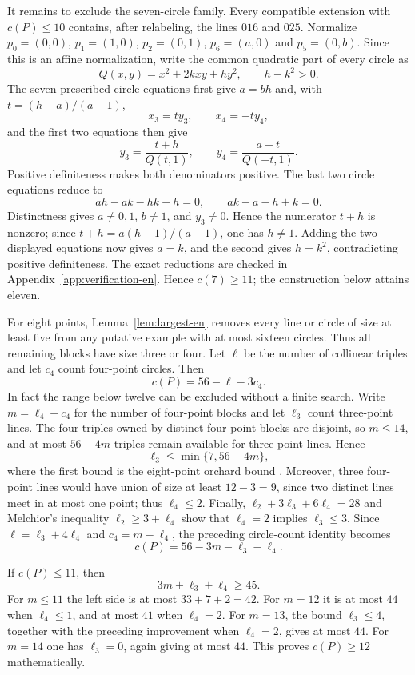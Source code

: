\documentclass[11pt,a4paper]{article}
\theoremstyle{definition}
\begin{document}
It remains to exclude the seven-circle family.  Every compatible extension with
$c(P)\le10$ contains, after relabeling, the lines $016$ and $025$.  Normalize
$p_0=(0,0)$, $p_1=(1,0)$, $p_2=(0,1)$, $p_6=(a,0)$ and $p_5=(0,b)$.  Since this
is an affine normalization, write the common quadratic part of every circle as
\[
 Q(x,y)=x^2+2kxy+hy^2,\qquad h-k^2>0.
\]
The seven prescribed circle equations first give $a=bh$ and, with
$t=(h-a)/(a-1)$,
\[
 x_3=ty_3,\qquad x_4=-ty_4,
\]
and the first two equations then give
\[
 y_3=\frac{t+h}{Q(t,1)},\qquad
 y_4=\frac{a-t}{Q(-t,1)}.
\]
Positive definiteness makes both denominators positive.  The last two circle
equations reduce to
\[
ah-ak-hk+h=0,\qquad ak-a-h+k=0.
\]
Distinctness gives $a\ne0,1$, $b\ne1$, and $y_3\ne0$.  Hence the numerator
$t+h$ is nonzero; since $t+h=a(h-1)/(a-1)$, one has $h\ne1$.
Adding the two displayed equations now
gives $a=k$, and the second gives $h=k^2$, contradicting positive definiteness.
The exact reductions are checked in Appendix~\ref{app:verification-en}.  Hence
$c(7)\ge11$; the construction below attains eleven.

For eight points, Lemma~\ref{lem:largest-en} removes every line or circle of size
at least five from any putative example with at most sixteen circles.  Thus all
remaining blocks have size three or four.  Let $\ell$ be the number of collinear
triples and let $c_4$ count four-point circles.  Then
\[
c(P)=56-\ell-3c_4.
\]
In fact the range below twelve can be excluded without a finite search.  Write
$m=\ell_4+c_4$ for the number of four-point blocks and let $\ell_3$ count
three-point lines.  The four triples owned by distinct four-point blocks are
disjoint, so $m\le14$, and at most $56-4m$ triples remain available for
three-point lines.  Hence
\[
 \ell_3\le\min\{7,56-4m\},
\]
where the first bound is the eight-point orchard bound
\cite[Table~I]{burr-grunbaum-sloane-en}.  Moreover, three four-point lines
would have union of size at least $12-3=9$, since two distinct lines meet in
at most one point; thus $\ell_4\le2$.  Finally,
$\ell_2+3\ell_3+6\ell_4=28$ and Melchior's inequality
$\ell_2\ge3+\ell_4$ show that $\ell_4=2$ implies $\ell_3\le3$.
Since $\ell=\ell_3+4\ell_4$ and $c_4=m-\ell_4$, the preceding circle-count
identity becomes
\[
 c(P)=56-3m-\ell_3-\ell_4.
\]

If $c(P)\le11$, then
\[
 3m+\ell_3+\ell_4\ge45.
\]
For $m\le11$ the left side is at most $33+7+2=42$.  For $m=12$ it is
at most $44$ when $\ell_4\le1$, and at most $41$ when $\ell_4=2$.
For $m=13$, the bound $\ell_3\le4$, together with the preceding improvement
when $\ell_4=2$, gives at most $44$.  For $m=14$ one has $\ell_3=0$, again
giving at most $44$.  This proves $c(P)\ge12$ mathematically.
\end{document}
